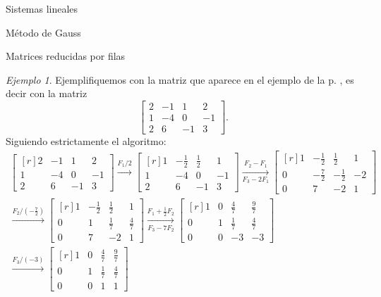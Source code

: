 \documentclass[a4paper,12pt,twoside,spanish,reqno]{amsbook}
\numberwithin{equation}{section}
\theoremstyle{definition}
\theoremstyle{remark}
\newtheorem*{ejemplo*}{Ejemplo}
\begin{document}
\begin{chapter}{Sistemas lineales}
\begin{section}{Método de Gauss }
\begin{subsection}{Matrices reducidas por filas}
                
                \begin{ejemplo*} Ejemplifiquemos con la matriz que aparece en el ejemplo de la p. \pageref{ejemplo2.11},  es decir con la matriz
                    $$
                    \begin{bmatrix} 2& -1&1& 2 \\ 1&-4 &0&-1 \\ 2&6&-1&3 \end{bmatrix}.
                    $$
                    Siguiendo estrictamente el algoritmo:
                    \begin{multline*}
                    \begin{bmatrix*}[r] 2& -1&1& 2 \\ 1&-4 &0&-1 \\ 2&6&-1&3 \end{bmatrix*}
                    \stackrel{F_1/2}{\longrightarrow} 
                    \begin{bmatrix*}[r] 1& -\frac12&\frac12& 1 \\ 1&-4 &0&-1 \\ 2&6&-1&3 \end{bmatrix*}
                    \underset{F_3-2F_1}{\stackrel{F_2- F_1}{\longrightarrow}} 
                    \begin{bmatrix*}[r] 1& -\frac12&\frac12& 1 \\ 0&-\frac72 &-\frac12&-2 \\ 0&7&-2&1 \end{bmatrix*}
                    \\
                    \stackrel{F_2/(-\frac72)}{\longrightarrow} 
                    \begin{bmatrix*}[r] 1& -\frac12&\frac12& 1 \\ 0&1 &\frac17&\frac47 \\ 0&7&-2&1 \end{bmatrix*}
                    \underset{F_3-7F_2}{\stackrel{F_1 +\frac12 F_2}{\longrightarrow}} 
                    \begin{bmatrix*}[r] 1& 0&\frac47& \frac97 \\ 0&1 &\frac17&\frac47 \\ 0&0&-3&-3 \end{bmatrix*}
                    \\
                    \stackrel{F_3/(-3)}{\longrightarrow} 
                    \begin{bmatrix*}[r] 1& 0&\frac47& \frac97 \\ 0&1 &\frac17&\frac47 \\ 0&0&1&1 \end{bmatrix*}

\end{multline*}
\end{ejemplo*}
\end{subsection}
\end{section}
\end{chapter}
\end{document}
